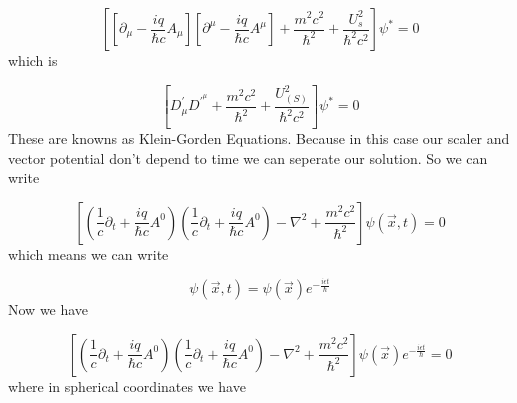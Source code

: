 \documentclass{article}
\begin{document}
\begin{equation}
    \left[\left[\partial_{\mu}-\frac{i q}{\hbar c} A_{\mu}\right]\left[\partial^{\mu}-\frac{i q}{\hbar c} A^{\mu}\right]+\frac{m^{2} c^{2}}{\hbar^{2}}+\frac{U_{s}^{2}}{\hbar^{2} c^{2}}\right] \psi^{*}= 0
\end{equation}
which is

\begin{equation}
    \left[D^{\prime}_{\mu} D^{\prime}^{\mu}+\frac{m^{2} c^{2}}{\hbar^{2}}+\frac{U_{(S)}^{2}}{\hbar^{2} c^{2}}\right] \psi^{*}=0
\end{equation}
These are knowns as Klein-Gorden Equations. Because in this case our scaler and vector potential don't depend to time we can seperate our solution. So we can write 

\begin{equation}
    \left[(\frac{1}{c} \partial_{t} + \frac{iq}{\hbar c}A^{0})(\frac{1}{c} \partial_{t} + \frac{iq}{\hbar c}A^{0}) - \nabla^{2} + \frac{m^{2}c^{2}}{\hbar^{2}}\right] \psi(\vec{x}, t) = 0
\end{equation}
which means we can write

\begin{equation}
    \psi(\vec{x}, t) = \psi(\vec{x}) e^{-\frac{i\epsilon t}{\hbar}}
\end{equation}
Now we have 

\begin{equation}
    \left[(\frac{1}{c} \partial_{t} + \frac{iq}{\hbar c}A^{0})(\frac{1}{c} \partial_{t} + \frac{iq}{\hbar c}A^{0}) - \nabla^{2} + \frac{m^{2}c^{2}}{\hbar^{2}}\right] \psi(\vec{x}) e^{-\frac{i\epsilon t}{\hbar}} = 0
\end{equation}
where in spherical coordinates we have
\end{document}
